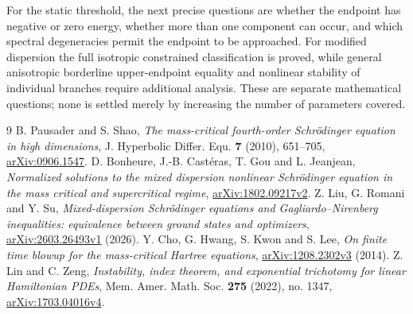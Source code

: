 \documentclass[11pt,a4paper]{article}
\theoremstyle{remark}\newtheorem{remark}[theorem]{Remark}
\begin{document}
For the static threshold, the next precise questions are whether the
endpoint has negative or zero energy, whether more than one component
can occur, and which spectral degeneracies permit the endpoint to be
approached. For modified dispersion the full isotropic constrained
classification is proved, while general anisotropic borderline
upper-endpoint equality and nonlinear stability of individual branches
require additional analysis. These are separate mathematical questions;
none is settled merely by increasing the number of parameters covered.

\begin{thebibliography}{9}
 B. Pausader and S. Shao,
\emph{The mass-critical fourth-order Schr\"odinger equation in high dimensions},
J. Hyperbolic Differ. Equ. \textbf{7} (2010), 651--705,
\href{https://arxiv.org/abs/0906.1547}{arXiv:0906.1547}.
 D. Bonheure, J.-B. Cast\'eras, T. Gou and L. Jeanjean,
\emph{Normalized solutions to the mixed dispersion nonlinear Schr\"odinger
equation in the mass critical and supercritical regime},
\href{https://arxiv.org/abs/1802.09217}{arXiv:1802.09217v2}.
 Z. Liu, G. Romani and Y. Su,
\emph{Mixed-dispersion Schr\"odinger equations and Gagliardo--Nirenberg
inequalities: equivalence between ground states and optimizers},
\href{https://arxiv.org/abs/2603.26493}{arXiv:2603.26493v1} (2026).
 Y. Cho, G. Hwang, S. Kwon and S. Lee,
\emph{On finite time blowup for the mass-critical Hartree equations},
\href{https://arxiv.org/abs/1208.2302}{arXiv:1208.2302v3} (2014).
 Z. Lin and C. Zeng,
\emph{Instability, index theorem, and exponential trichotomy for linear
Hamiltonian PDEs}, Mem. Amer. Math. Soc. \textbf{275} (2022), no. 1347,
\href{https://arxiv.org/abs/1703.04016}{arXiv:1703.04016v4}.
\end{thebibliography}
\end{document}
